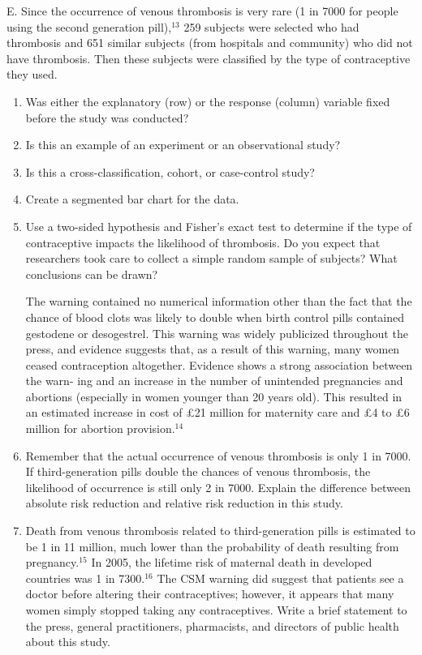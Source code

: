 \documentclass[
]{report}
\newcounter{excount}
\renewcommand{\theexcount}{E\arabic{excount}}
\begin{document}
\begin{list}{\theexcount.}{ \setlength{\itemsep}{0.5em}}
Since the occurrence of venous thrombosis is very rare (1 in 7000 for people using the second
generation pill),$^{13}$ 259 subjects were selected who had thrombosis and 651 similar subjects (from
hospitals and community) who did not have thrombosis. Then these subjects were classified by the
type of contraceptive they used.

  \begin{enumerate}
    \item Was either the explanatory (row) or the response (column) variable fixed before the study was conducted?
    \item Is this an example of an experiment or an observational study?
    \item Is this a cross-classification, cohort, or case-control study?
    \item Create a segmented bar chart for the data.
    \item Use a two-sided hypothesis and Fisher’s exact test to determine if the type of contraceptive impacts the likelihood of thrombosis. Do you expect that researchers took care to collect a simple random sample of subjects? What conclusions can be drawn?
    
    The warning contained no numerical information other than the fact that the chance of blood clots
was likely to double when birth control pills contained gestodene or desogestrel. This warning was
widely publicized throughout the press, and evidence suggests that, as a result of this warning, many
women ceased contraception altogether. Evidence shows a strong association between the warn-
ing and an increase in the number of unintended pregnancies and abortions (especially in women
younger than 20 years old). This resulted in an estimated increase in cost of £21 million for maternity
care and £4 to £6 million for abortion provision.$^{14}$
    \item Remember that the actual occurrence of venous thrombosis is only 1 in 7000. If third-generation pills double the chances of venous thrombosis, the likelihood of occurrence is still only 2 in 7000. Explain the difference between absolute risk reduction and relative risk reduction in this study.
    \item Death from venous thrombosis related to third-generation pills is estimated to be 1 in 11 million, much lower than the probability of death resulting from pregnancy.$^{15}$ In 2005, the lifetime risk of maternal death in developed countries was 1 in 7300.$^{16}$ The CSM warning did suggest that patients see a doctor before altering their contraceptives; however, it appears that many women simply stopped taking any contraceptives. Write a brief statement to the press, general practitioners, pharmacists, and directors of public health about this study.
  \end{enumerate}


\end{list}
\end{document}
